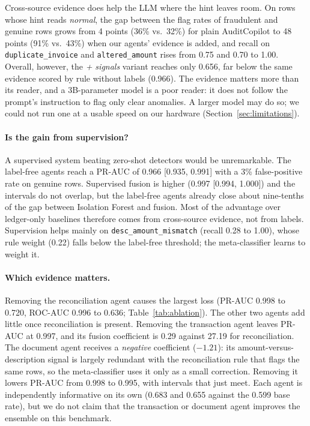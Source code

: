 \documentclass{article}
\newcommand{\typ}[1]{\texttt{#1}}
\begin{document}
Cross-source evidence does help the LLM where the hint leaves room. On rows whose hint reads \emph{normal}, the gap between the flag rates of fraudulent and genuine rows grows from 4 points (36\% vs.\ 32\%) for plain AuditCopilot to 48 points (91\% vs.\ 43\%) when our agents' evidence is added, and recall on \typ{duplicate\_invoice} and \typ{altered\_amount} rises from 0.75 and 0.70 to 1.00. Overall, however, the \emph{+ signals} variant reaches only 0.656, far below the same evidence scored by rule without labels (0.966). The evidence matters more than its reader, and a 3B-parameter model is a poor reader: it does not follow the prompt's instruction to flag only clear anomalies. A larger model may do so; we could not run one at a usable speed on our hardware (Section~\ref{sec:limitations}).

\paragraph{Is the gain from supervision?} A supervised system beating zero-shot detectors would be unremarkable. The label-free agents reach a PR-AUC of 0.966 [0.935, 0.991] with a 3\% false-positive rate on genuine rows. Supervised fusion is higher (0.997 [0.994, 1.000]) and the intervals do not overlap, but the label-free agents already close about nine-tenths of the gap between Isolation Forest and fusion. Most of the advantage over ledger-only baselines therefore comes from cross-source evidence, not from labels. Supervision helps mainly on \typ{desc\_amount\_mismatch} (recall 0.28 to 1.00), whose rule weight (0.22) falls below the label-free threshold; the meta-classifier learns to weight it.

\paragraph{Which evidence matters.} Removing the reconciliation agent causes the largest loss (PR-AUC 0.998 to 0.720, ROC-AUC 0.996 to 0.636; Table~\ref{tab:ablation}). The other two agents add little once reconciliation is present. Removing the transaction agent leaves PR-AUC at 0.997, and its fusion coefficient is 0.29 against 27.19 for reconciliation. The document agent receives a \emph{negative} coefficient ($-1.21$): its amount-versus-description signal is largely redundant with the reconciliation rule that flags the same rows, so the meta-classifier uses it only as a small correction. Removing it lowers PR-AUC from 0.998 to 0.995, with intervals that just meet. Each agent is independently informative on its own (0.683 and 0.655 against the 0.599 base rate), but we do not claim that the transaction or document agent improves the ensemble on this benchmark.
\end{document}
